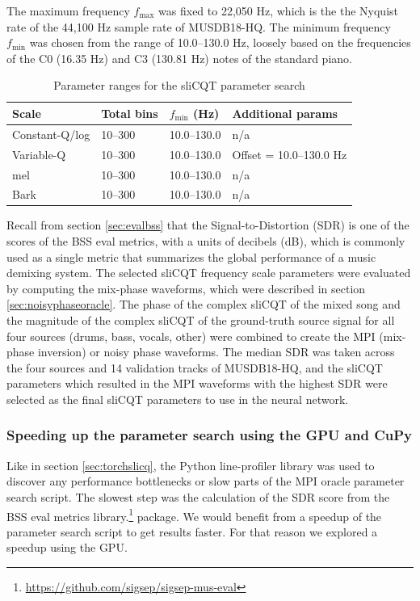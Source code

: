 \documentclass[report.tex]{subfiles}
\begin{document}
The maximum frequency $f_{\text{max}}$ was fixed to 22,050 Hz, which is the the Nyquist rate of the 44,100 Hz sample rate of MUSDB18-HQ. The minimum frequency $f_{\text{min}}$ was chosen from the range of 10.0--130.0 Hz, loosely based on the frequencies of the C0 (16.35 Hz) and C3 (130.81 Hz) notes of the standard piano.

\begin{table}[ht]
	\centering
	\caption{Parameter ranges for the sliCQT parameter search}
	\label{table:slicqparams}
\begin{tabular}{ |l|l|l|l| }
	 \hline
	 Scale & Total bins & $f_{\text{min}}$ (Hz) & Additional params \\
	 \hline
	 \hline
	 Constant-Q/log & 10--300 & 10.0--130.0 & n/a \\
	 \hline
	 Variable-Q & 10--300 & 10.0--130.0 & Offset = 10.0--130.0 Hz \\
	 \hline
	 mel & 10--300 & 10.0--130.0 & n/a \\
	 \hline
	 Bark & 10--300 & 10.0--130.0 & n/a \\
	 \hline
\end{tabular}
\end{table}

Recall from section \ref{sec:evalbss} that the Signal-to-Distortion (SDR) is one of the scores of the BSS eval metrics, with a units of decibels (dB), which is commonly used as a single metric that summarizes the global performance of a music demixing system. The selected sliCQT frequency scale parameters were evaluated by computing the mix-phase waveforms, which were described in section \ref{sec:noisyphaseoracle}. The phase of the complex sliCQT of the mixed song and the magnitude of the complex sliCQT of the ground-truth source signal for all four sources (drums, bass, vocals, other) were combined to create the MPI (mix-phase inversion) or noisy phase waveforms. The median SDR was taken across the four sources and 14 validation tracks of MUSDB18-HQ, and the sliCQT parameters which resulted in the MPI waveforms with the highest SDR were selected as the final sliCQT parameters to use in the neural network.

\subsubsection{Speeding up the parameter search using the GPU and CuPy}
\label{sec:fasterbsscupy}

Like in section \ref{sec:torchslicq}, the Python line-profiler library was used to discover any performance bottlenecks or slow parts of the MPI oracle parameter search script. The slowest step was the calculation of the SDR score from the BSS eval metrics library.\footnote{\url{https://github.com/sigsep/sigsep-mus-eval}} package. We would benefit from a speedup of the parameter search script to get results faster. For that reason we explored a speedup using the GPU.
\end{document}
